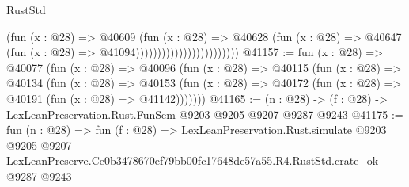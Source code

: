 \begin{lexlean}{RustStd}
\begin{coremodule}
                                            (fun (x : @28) =>
                                            @40609
                                              (fun (x : @28) =>
                                              @40628
                                                (fun (x : @28) =>
                                                @40647
                                                  (fun (x : @28) => @41094))))))))))))))))))))))))
@41157 := fun (x : @28) =>
  @40077
    (fun (x : @28) =>
    @40096
      (fun (x : @28) =>
      @40115
        (fun (x : @28) =>
        @40134
          (fun (x : @28) =>
          @40153 (fun (x : @28) => @40172 (fun (x : @28) => @40191 (fun (x : @28) => @41142)))))))
@41165 := (n : @28) -> (f : @28) -> LexLeanPreservation.Rust.FunSem @9203 @9205 @9207 @9287 @9243
@41175 := fun (n : @28) =>
  fun (f : @28) =>
  LexLeanPreservation.Rust.simulate
    @9203
    @9205
    @9207
    LexLeanPreserve.Ce0b3478670ef79bb00fc17648de57a55.R4.RustStd.crate_ok
    @9287
    @9243
\end{coremodule}
\end{lexlean}
